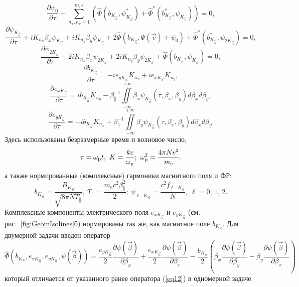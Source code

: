 \begin{equation}
\label{eq14}
    \dfrac{\partial \psi_0}{\partial \tau} 
    + \sum\limits^{m,s}_{n_x,n_y=1}\left( \hat \Phi(b_{K_{\vec{n}}},\psi_{K_{\vec{n}}}^*) 
    + \hat \Phi^*(b_{K_{\vec{n}}}^*,\psi_{K_{\vec{n}}}) \right)=0,
\end{equation}
\begin{equation}
    \dfrac{\partial \psi_{K_{\vec{n}}}}{\partial \tau}+iK_{n_x}\beta_x\psi_{K_{\vec{n}}}+iK_{n_y}\beta_y\psi_{K_{\vec{n}}}+2\hat \Phi(b_{K_{\vec{n}}},\Psi(\vec{v})+\psi_0)+\hat \Phi^*(b_{K_{\vec{n}}}^*,\psi_{2K_{\vec{n}}})=0,
\end{equation}
\begin{equation}
\label{eq16}
    \dfrac{\partial \psi_{2K_{\vec{n}}}}{\partial \tau}+2iK_{n_x}\beta_x\psi_{2K_{\vec{n}}}+2iK_{n_y}\beta_y\psi_{2K_{\vec{n}}}+\hat \Phi(b_{K_{\vec{n}}},\psi_{K_{\vec{n}}})=0,
\end{equation}
\begin{equation}
    \dfrac{\partial b_{K_{\vec{n}}}}{\partial \tau}=-ie_{y{K_{\vec{n}}}}K_{n_x}+ie_{x{K_{\vec{n}}}}K_{n_y},
\end{equation}
\begin{equation}
    \dfrac{\partial e_{x{K_{\vec{n}}}}}{\partial \tau}=ib_{K_{\vec{n}}}K_{n_y}-\beta_{\|}^{-1}\iint\limits^{+\infty}_{-\infty}\beta_x\psi_{K_{\vec{n}}}(\tau,\beta_x,\beta_y)d\beta_xd\beta_y,
\end{equation}
\begin{equation}
\label{eq19}
    \dfrac{\partial e_{y{K_{\vec{n}}}}}{\partial \tau}=-ib_{K_{\vec{n}}}K_{n_x}+\beta_{\|}^{-1}{\iint\limits^{+\infty}_{-\infty}\beta_y\psi_{K_{\vec{n}}}(\tau,\beta_x,\beta_y)d\beta_xd\beta_y} .
\end{equation}
Здесь использованы безразмерные время и волновое число, 
\begin{equation*}
    \tau=\wpl t, \
    K=\dfrac{kc}{\wpl}; \ 
    \wpl^2=\dfrac{4\pi Ne^2}{\me},
\end{equation*}
а также нормированные (комплексные) гармоники магнитного поля и ФР: 
\begin{equation}
\label{eq19plus1}
    b_{K_{\vec{n}}}=\dfrac{B_{K_{\vec{n}}}}{\sqrt{8\pi N T_{\|}}},\
    T_{\|}=\dfrac{m_ec^2\beta_{\|}^2}{2};\
    \psi_{\ell\cdot K_{\vec{n}}}=\dfrac{c^2f_{\ell\cdot K_{\vec{n}}}}{N},\ 
    \ell=0,\,1,\,2.  
\end{equation}
Комплексные компоненты электрического поля $e_{x{K_{\vec{n}}}}$ и $e_{y{K_{\vec{n}}}}$ (см. рис.~\ref{fig:GeomIsolines}б) нормированы так же, как магнитное поле $b_{K_{\vec{n}}}$. Для двумерной задачи введен оператор 
\begin{equation}
\label{eq:operator}
    \hat \Phi(b_{K_n},e_{x{K_{\vec{n}}}},e_{y{K_{\vec{n}}}},\psi(\vec{\beta}))=\dfrac{e_{y{K_{\vec{n}}}}}{2}\dfrac{\partial \psi(\vec{\beta})}{\partial \beta_y}+\dfrac{e_{x{K_{\vec{n}}}}}{2}\dfrac{\partial \psi(\vec{\beta})}{\partial \beta_x}-\dfrac{b_{K_n}}{2} \left(\beta_x\dfrac{\partial \psi(\vec{\beta})}{\partial \beta_y}-\beta_y\dfrac{\partial \psi(\vec{\beta})}{\partial \beta_x}\right)
\end{equation}
который отличается от указанного ранее оператора (\ref{eq12}) в одномерной задаче.

